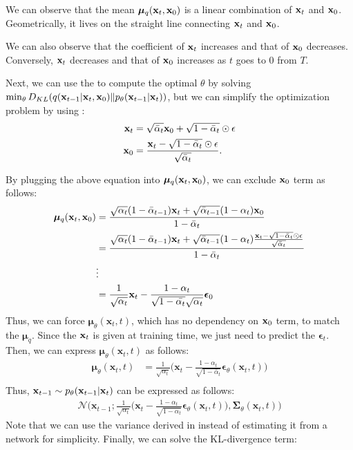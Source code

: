 We can observe that the mean $\boldsymbol{\mu}_q({\mathbf{x}}_t,{\mathbf{x}}_0)$ is a linear combination of ${\mathbf{x}}_t$ and ${\mathbf{x}}_0$. Geometrically, it lives on the straight line connecting ${\mathbf{x}}_t$ and ${\mathbf{x}}_0$.

We can also observe that the coefficient of ${\mathbf{x}}_t$ increases and that of ${\mathbf{x}}_0$ decreases. Conversely, ${\mathbf{x}}_t$ decreases and that of ${\mathbf{x}}_0$ increases as $t$ goes to 0 from $T$.

Next, we can use the  to compute the optimal $\theta$ by solving $\min_\theta D_{KL}(q({\mathbf{x}}_{t-1}|{\mathbf{x}}_t, {\mathbf{x}}_0)\|p_\theta({\mathbf{x}}_{t-1}|{\mathbf{x}}_{t}))$, but we can simplify the optimization problem by using :
\begin{align*}
	{\mathbf{x}}_t &= \sqrt{\bar{\alpha}_t} \mathbf{x}_{0}+ \sqrt{1-\bar{\alpha}_t} \odot \epsilon\\
	\mathbf{x}_{0} &= \frac{{\mathbf{x}}_t - \sqrt{1-\bar{\alpha}_t}\odot \epsilon}{\sqrt{\bar{\alpha}_t}}.
\end{align*}

By plugging the above equation into $\boldsymbol{\mu}_q({\mathbf{x}}_t,{\mathbf{x}}_0)$, we can exclude ${\mathbf{x}}_0$ term as follows:
\begin{align}
	\boldsymbol{\mu}_q({\mathbf{x}}_t,{\mathbf{x}}_0) &= \frac{\sqrt{{\alpha}_{t}}(1-\bar{\alpha}_{t-1}){\mathbf{x}}_t+\sqrt{\bar{\alpha}_{t-1}}(1-{\alpha}_{t}){\mathbf{x}}_0}{1-\bar{\alpha}_{t}}\\
									  &= \frac{\sqrt{{\alpha}_{t}}(1-\bar{\alpha}_{t-1}){\mathbf{x}}_t+\sqrt{\bar{\alpha}_{t-1}}(1-{\alpha}_{t})\frac{{\mathbf{x}}_t - \sqrt{1-\bar{\alpha}_t}\odot \epsilon}{\sqrt{\bar{\alpha}_t} }}{1-\bar{\alpha}_{t}}\\
									  &\vdots\\
									  &= \frac{1}{\sqrt{\alpha_t}}{\mathbf{x}}_t - \frac{1-\alpha_t}{\sqrt{1-\bar{\alpha_t}}\sqrt{\alpha_t}}\boldsymbol{\epsilon}_0
	\label{eq:diffusion_mean_simple}
\end{align}
Thus, we can force $\boldsymbol{\mu}_\theta(\mathbf{x}_t, t)$, which has no dependency on ${\mathbf{x}}_0$ term, to match the $\boldsymbol{\mu}_q$. Since the ${\mathbf{x}}_t$ is given at training time, we just need to predict the $\boldsymbol{\epsilon}_t$. Then, we can express $\boldsymbol{\mu}_\theta(\mathbf{x}_t, t)$ as follows:
\begin{align*}
\boldsymbol{\mu}_\theta(\mathbf{x}_t, t) &= \frac{1}{\sqrt{\alpha_t}} \bigg( \mathbf{x}_t - \frac{1 - \alpha_t}{\sqrt{1 - \bar{\alpha}_t}} \boldsymbol{\epsilon}_\theta(\mathbf{x}_t, t) \bigg) \\
\end{align*}
Thus, ${\mathbf{x}}_{t-1}\sim p_\theta(\mathbf{x}_{t-1} \vert \mathbf{x}_t)$ can be expressed as follows:
\begin{align*}
	\mathcal{N}\Bigg(\mathbf{x}_{t-1}; \frac{1}{\sqrt{\alpha_t}} \bigg( \mathbf{x}_t - \frac{1 - \alpha_t}{\sqrt{1 - \bar{\alpha}_t}} \boldsymbol{\epsilon}_\theta(\mathbf{x}_t, t) \bigg), \boldsymbol{\Sigma}_\theta(\mathbf{x}_t, t)\Bigg)
\end{align*}
Note that we can use the variance derived in  instead of estimating it from a network for simplicity. Finally, we can solve the KL-divergence term:

